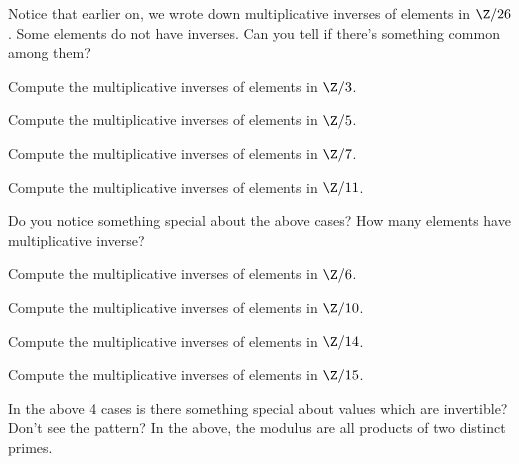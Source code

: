   Notice that earlier on, we wrote down multiplicative inverses of
  elements in $\Z/26$. Some elements do not have inverses.
  Can you tell if there's something common among them?
  \begin{myenum}
    \item Compute the multiplicative inverses of elements in $\Z/3$. 
    \item Compute the multiplicative inverses of elements in $\Z/5$. 
    \item Compute the multiplicative inverses of elements in $\Z/7$.
    \item Compute the multiplicative inverses of elements in $\Z/11$.
    \item Do you notice something special about the above cases?
      How many elements have multiplicative inverse?
    \item Compute the multiplicative inverses of elements in $\Z/6$.
    \item Compute the multiplicative inverses of elements in $\Z/10$. 
    \item Compute the multiplicative inverses of elements in $\Z/14$. 
    \item Compute the multiplicative inverses of elements in $\Z/15$. 
    \item In the above 4 cases is there something special about values which are invertible?
      Don't see the pattern? In the above, the modulus are all products of two distinct primes.
  \end{myenum}
